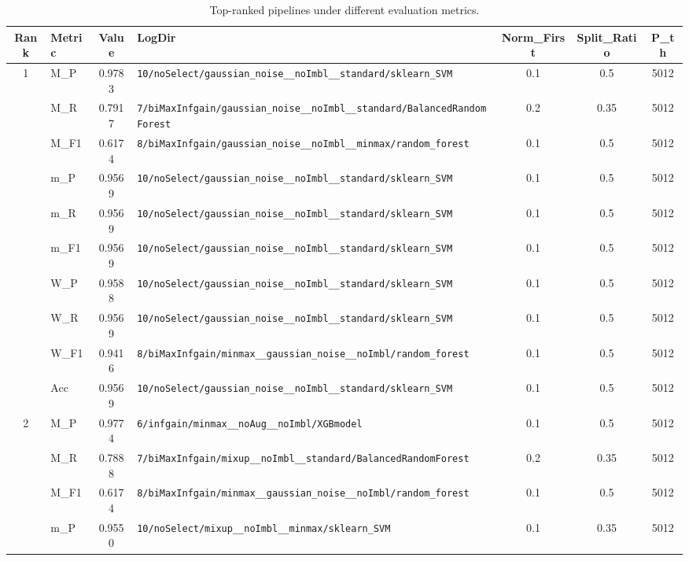 \begin{table}[htbp]
\caption{Top-ranked pipelines under different evaluation metrics.}
\label{tab:rank_metric_vertical}
\centering
\small
\setlength{\tabcolsep}{4pt}
\begin{tabular}{|c|l|c|>{\ttfamily\footnotesize}p{7.2cm}|c|c|c|}
\hline
Rank & Metric & Value & LogDir & Norm\_First & Split\_Ratio & P\_th \\
\hline
\multirow{10}{*}{1} & M\_P & 0.9783 & \texttt{10/noSelect/gaussian\_noise\_\_noImbl\_\_standard/sklearn\_SVM} & 0.1 & 0.5  & 5012 \\ 
 & M\_R & 0.7917 & \texttt{7/biMaxInfgain/gaussian\_noise\_\_noImbl\_\_standard/BalancedRandomForest} & 0.2 & 0.35  & 5012 \\ 
 & M\_F1 & 0.6174 & \texttt{8/biMaxInfgain/gaussian\_noise\_\_noImbl\_\_minmax/random\_forest} & 0.1 & 0.5  & 5012 \\ 
 & m\_P & 0.9569 & \texttt{10/noSelect/gaussian\_noise\_\_noImbl\_\_standard/sklearn\_SVM} & 0.1 & 0.5  & 5012 \\ 
 & m\_R & 0.9569 & \texttt{10/noSelect/gaussian\_noise\_\_noImbl\_\_standard/sklearn\_SVM} & 0.1 & 0.5  & 5012 \\ 
 & m\_F1 & 0.9569 & \texttt{10/noSelect/gaussian\_noise\_\_noImbl\_\_standard/sklearn\_SVM} & 0.1 & 0.5  & 5012 \\ 
 & W\_P & 0.9588 & \texttt{10/noSelect/gaussian\_noise\_\_noImbl\_\_standard/sklearn\_SVM} & 0.1 & 0.5  & 5012 \\ 
 & W\_R & 0.9569 & \texttt{10/noSelect/gaussian\_noise\_\_noImbl\_\_standard/sklearn\_SVM} & 0.1 & 0.5  & 5012 \\ 
 & W\_F1 & 0.9416 & \texttt{8/biMaxInfgain/minmax\_\_gaussian\_noise\_\_noImbl/random\_forest} & 0.1 & 0.5  & 5012 \\ 
 & Acc & 0.9569 & \texttt{10/noSelect/gaussian\_noise\_\_noImbl\_\_standard/sklearn\_SVM} & 0.1 & 0.5  & 5012 \\ 
\hline
\multirow{10}{*}{2} & M\_P & 0.9774 & \texttt{6/infgain/minmax\_\_noAug\_\_noImbl/XGBmodel} & 0.1 & 0.5  & 5012 \\ 
 & M\_R & 0.7888 & \texttt{7/biMaxInfgain/mixup\_\_noImbl\_\_standard/BalancedRandomForest} & 0.2 & 0.35  & 5012 \\ 
 & M\_F1 & 0.6174 & \texttt{8/biMaxInfgain/minmax\_\_gaussian\_noise\_\_noImbl/random\_forest} & 0.1 & 0.5  & 5012 \\ 
 & m\_P & 0.9550 & \texttt{10/noSelect/mixup\_\_noImbl\_\_minmax/sklearn\_SVM} & 0.1 & 0.35  & 5012 \\ 

\end{tabular}
\end{table}
